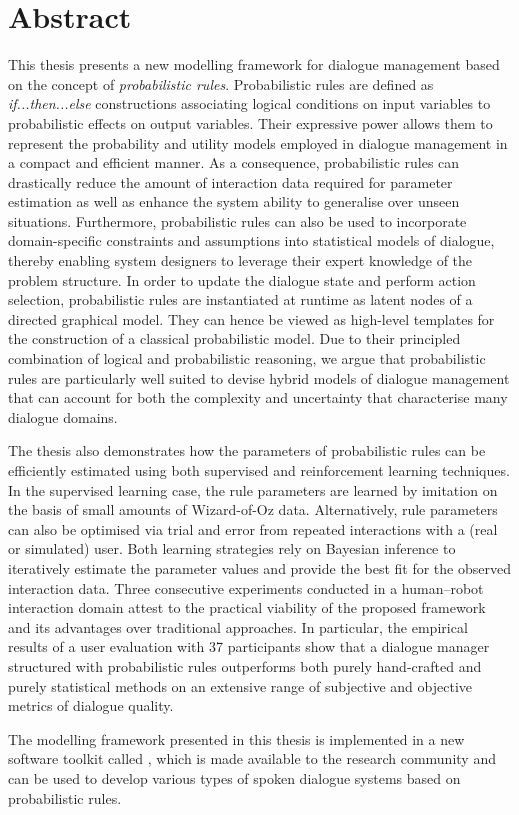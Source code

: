 \chapter*{Abstract}

This thesis presents a new modelling framework for dialogue management based on the concept of \textit{probabilistic rules}.  Probabilistic rules are defined as \textit{if...then...else} constructions associating logical conditions on input variables to probabilistic effects on output variables. Their expressive power 
allows them to represent the probability and utility models employed in dialogue management in a compact and efficient manner. As a consequence, probabilistic rules can drastically reduce the amount of interaction data required for parameter estimation as well as enhance the system ability to generalise over unseen situations. Furthermore, probabilistic rules can also be used to incorporate domain-specific constraints and assumptions into statistical models of dialogue, thereby enabling system designers to leverage their expert knowledge of the problem structure.  In order to update the dialogue state and perform action selection, probabilistic rules are instantiated at runtime as latent nodes of a directed graphical model.  They can hence be viewed as high-level templates for the construction of a classical probabilistic model. Due to their principled combination of logical and probabilistic reasoning, we argue that probabilistic rules are particularly well suited to devise hybrid models of dialogue management that can account for both the complexity and uncertainty that characterise many dialogue domains.

The thesis also demonstrates how the parameters of probabilistic rules can be efficiently estimated using both supervised and reinforcement learning techniques. In the supervised learning case, the rule parameters are learned by imitation on the basis of small amounts of Wizard-of-Oz data.  Alternatively, rule parameters can also be optimised via trial and error from repeated interactions with a (real or simulated) 
user. Both learning strategies rely on Bayesian inference to iteratively estimate the parameter values and provide the best fit for the observed interaction data. Three consecutive experiments conducted in a human--robot interaction domain attest to the practical viability of the proposed framework and its advantages over traditional approaches.  In particular, the empirical results of a user evaluation with 37 participants show that a dialogue manager structured with probabilistic rules outperforms both purely hand-crafted and purely statistical methods on an extensive range of subjective and objective metrics of dialogue quality.

The modelling framework presented in this thesis is implemented in a new software toolkit called \opendial{}, which is made available to the research community and can be used to develop various types of spoken dialogue systems based on probabilistic rules. 
